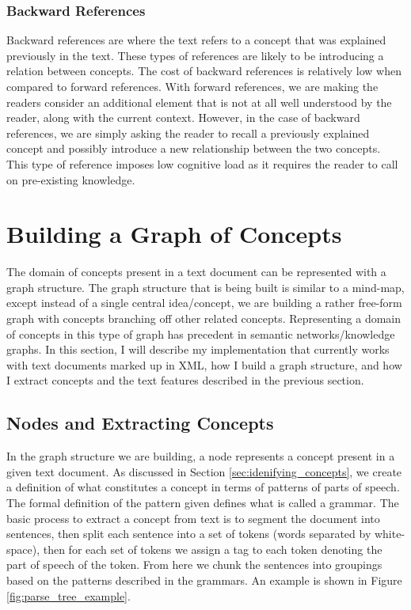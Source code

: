 \documentclass[12pt]{article}
\theoremstyle{grammarstyle}
\begin{document}
\subsubsection{Backward References}
Backward references are where the text refers to a concept that was explained previously in the text. These types of references are likely to be introducing a relation between concepts. The cost of backward references is relatively low when compared to forward references. With forward references, we are making the readers consider an additional element that is not at all well understood by the reader, along with the current context. However, in the case of backward references, we are simply asking the reader to recall a previously explained concept and possibly introduce a new relationship between the two concepts. This type of reference imposes low cognitive load as it requires the reader to call on pre-existing knowledge.

\section{Building a Graph of Concepts} \label{sec:building_a_mind-map}
The domain of concepts present in a text document can be represented with a graph structure. The graph structure that is being built is similar to a mind-map, except instead of a single central idea/concept, we are building a rather free-form graph with concepts branching off other related concepts. Representing a domain of concepts in this type of graph has precedent in semantic networks/knowledge graphs. 
In this section, I will describe my implementation that currently works with text documents marked up in XML, how I build a graph structure, and how I extract concepts and the text features described in the previous section.

\subsection{Nodes and Extracting Concepts}
In the graph structure we are building, a node represents a concept present in a given text document. As discussed in Section \ref{sec:idenifying_concepts}, we create a definition of what constitutes a concept in terms of patterns of parts of speech. The formal definition of the pattern given defines what is called a grammar. The basic process to extract a concept from text is to segment the document into sentences, then split each sentence into a set of tokens (words separated by white-space), then for each set of tokens we assign a tag to each token denoting the part of speech of the token. From here we chunk the sentences into groupings based on the patterns described in the grammars. An example is shown in Figure \ref{fig:parse_tree_example}.
\end{document}
